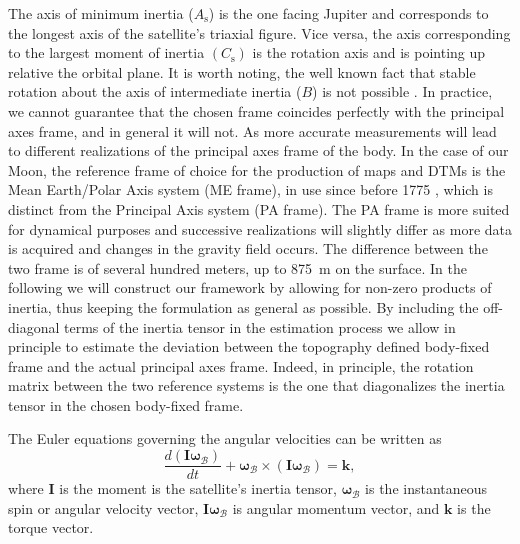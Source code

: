 \documentclass[lineno, pdflatex,sn-mathphys-ay]{sn-jnl}
\theoremstyle{thmstyleone}%
\theoremstyle{thmstyletwo}%
\theoremstyle{thmstylethree}%
\renewcommand{\vec}[1]{\boldsymbol{#1}}
\begin{document}
The axis of minimum inertia ($A_\mathrm{s}$) is the one facing Jupiter and corresponds to the longest axis of the satellite's triaxial figure. Vice versa, the axis corresponding to the largest moment of inertia $(C_\mathrm{s})$ is the rotation axis and is pointing up relative the orbital plane. 
It is worth noting, the well known fact that stable rotation about the axis of intermediate inertia ($B$) is not possible \citep[see, e.g.,][]{Goldstein:102554}.
%
In practice, we cannot guarantee that the chosen frame coincides perfectly with the principal axes frame, and in general it will not. As more accurate measurements will lead to different realizations of the principal axes frame of the body. 
%
In the case of our Moon, the reference frame of choice for the production of maps and DTMs is the Mean Earth/Polar Axis system (ME frame), in use since before 1775 \citep[see, e.g.,][]{2000JGR...10520277D}, which is distinct from the Principal Axis system (PA frame). The PA frame is more suited for dynamical purposes and successive realizations will slightly differ as more data is acquired and changes in the gravity field occurs. The difference between the two frame is of several hundred meters, up to \SI{875}{m} on the surface. %
In the following we will construct our framework by allowing for non-zero products of inertia, thus keeping the formulation as general as possible.
By including the off-diagonal terms of the inertia tensor in the estimation process we allow in principle to estimate the deviation between the topography defined body-fixed frame and the actual principal axes frame. Indeed, in principle, the rotation matrix between the two reference systems is the one that diagonalizes the inertia tensor in the chosen body-fixed frame.



%
The Euler equations governing the angular velocities can be written as
\begin{equation}\label{eq:euler_solid_moon_williams_V2}
	\frac{d(\vec{I} \vec{\omega}_{\mathcal{B}})}{dt} + \vec{\omega}_{\mathcal{B}} \times(\vec{I} \vec{\omega}_{\mathcal{B}}) = \vec{k},
\end{equation}
%
where $\vec{I}$ is the moment is the satellite's inertia tensor, $\vec{\omega}_{\mathcal{B}}$ is the instantaneous spin or angular velocity vector,  $\vec{I} \vec{\omega}_{\mathcal{B}}$ is angular momentum vector, and $\vec{k}$ is the torque vector. 
\end{document}
